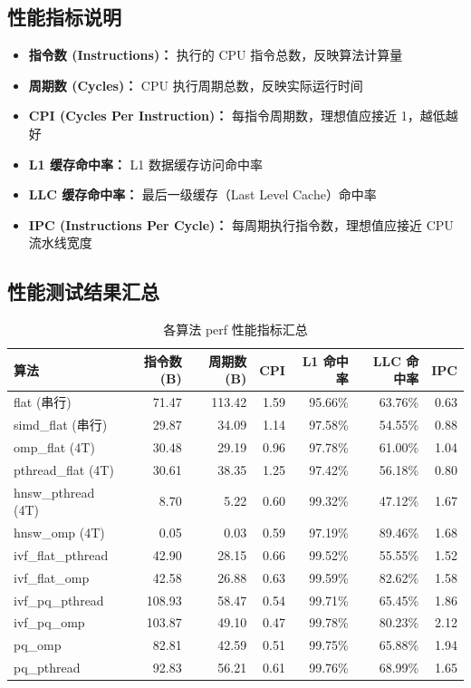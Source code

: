 \documentclass[a4paper]{article}
\begin{document}
\subsection{性能指标说明}

\begin{itemize}
\item \textbf{指令数 (Instructions)：} 执行的 CPU 指令总数，反映算法计算量
\item \textbf{周期数 (Cycles)：} CPU 执行周期总数，反映实际运行时间
\item \textbf{CPI (Cycles Per Instruction)：} 每指令周期数，理想值应接近 1，越低越好
\item \textbf{L1 缓存命中率：} L1 数据缓存访问命中率
\item \textbf{LLC 缓存命中率：} 最后一级缓存（Last Level Cache）命中率
\item \textbf{IPC (Instructions Per Cycle)：} 每周期执行指令数，理想值应接近 CPU 流水线宽度
\end{itemize}

\subsection{性能测试结果汇总}

\begin{table}[htbp]
\centering
\caption{各算法 perf 性能指标汇总}
\small
\begin{tabular}{lrrrrrr}
\toprule
算法 & 指令数 (B) & 周期数 (B) & CPI & L1 命中率 & LLC 命中率 & IPC \\
\midrule
flat (串行)        & 71.47 & 113.42 & 1.59 & 95.66\% & 63.76\% & 0.63 \\
simd\_flat (串行)  & 29.87 &  34.09 & 1.14 & 97.58\% & 54.55\% & 0.88 \\
omp\_flat (4T)      & 30.48 &  29.19 & 0.96 & 97.78\% & 61.00\% & 1.04 \\
pthread\_flat (4T)  & 30.61 &  38.35 & 1.25 & 97.42\% & 56.18\% & 0.80 \\
\midrule
hnsw\_pthread (4T)  &  8.70 &   5.22 & 0.60 & 99.32\% & 47.12\% & 1.67 \\
hnsw\_omp (4T)      &  0.05 &   0.03 & 0.59 & 97.19\% & 89.46\% & 1.68 \\
\midrule
ivf\_flat\_pthread  & 42.90 &  28.15 & 0.66 & 99.52\% & 55.55\% & 1.52 \\
ivf\_flat\_omp      & 42.58 &  26.88 & 0.63 & 99.59\% & 82.62\% & 1.58 \\
\midrule
ivf\_pq\_pthread    & 108.93 & 58.47 & 0.54 & 99.71\% & 65.45\% & 1.86 \\
ivf\_pq\_omp        & 103.87 & 49.10 & 0.47 & 99.78\% & 80.23\% & 2.12 \\
\midrule
pq\_omp             &  82.81 &  42.59 & 0.51 & 99.75\% & 65.88\% & 1.94 \\
pq\_pthread         &  92.83 &  56.21 & 0.61 & 99.76\% & 68.99\% & 1.65 \\
\bottomrule
\end{tabular}
\end{table}
\end{document}
